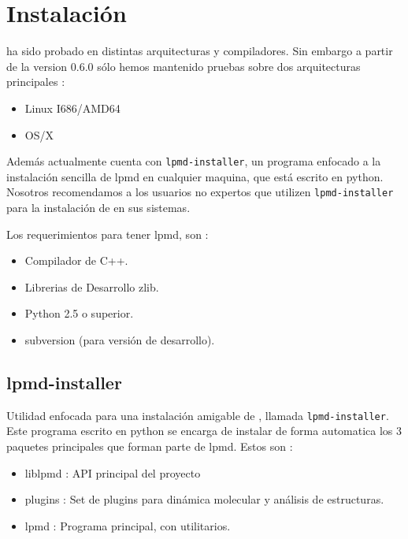 \chapter{Instalaci\'on}
\label{chap:inst}

{\lpmd} ha sido probado en distintas arquitecturas y compiladores. Sin embargo a partir de la version 0.6.0 s\'olo hemos mantenido pruebas sobre dos arquitecturas principales :

\begin{itemize}
 \item Linux I686/AMD64
 \item OS/X
\end{itemize}

Adem\'as actualmente {\lpmd} cuenta con \verb|lpmd-installer|, un programa enfocado a la instalaci\'on sencilla de lpmd en cualquier maquina, que est\'a escrito en python. Nosotros recomendamos a los usuarios no expertos que utilizen \verb|lpmd-installer| para la instalaci\'on de {\lpmd} en sus sistemas.

Los requerimientos para tener lpmd, son :

\begin{itemize}
 \item Compilador de C++.
 \item Librerias de Desarrollo zlib.
 \item Python 2.5 o superior.
 \item subversion (para versi\'on de desarrollo).
\end{itemize} 

\section{lpmd-installer}

Utilidad enfocada para una instalaci\'on amigable de {\lpmd}, llamada \verb|lpmd-installer|. Este programa escrito en python se encarga de instalar de forma automatica los 3 paquetes principales que forman parte de lpmd. Estos son :

\begin{itemize}
 \item liblpmd : API principal del proyecto
 \item plugins : Set de plugins para din\'amica molecular y an\'alisis de estructuras.
 \item lpmd : Programa principal, con utilitarios.
\end{itemize}


